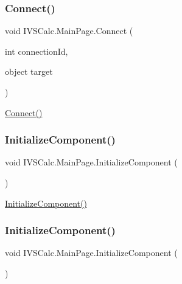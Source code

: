 \subsubsection{\texorpdfstring{Connect()}{Connect()}\hspace{0.1cm}{\footnotesize\ttfamily [5/5]}}
{\footnotesize\ttfamily void I\+V\+S\+Calc.\+Main\+Page.\+Connect (\begin{DoxyParamCaption}\item[{int}]{connection\+Id,  }\item[{object}]{target }\end{DoxyParamCaption})}



\hyperlink{class_i_v_s_calc_1_1_main_page_a36a7263a9c76a6fdfa392266c3b56122}{Connect()} 

\mbox{\label{class_i_v_s_calc_1_1_main_page_a82228985b36d2c45b809d7b2ba489aef}} 
\subsubsection{\texorpdfstring{Initialize\+Component()}{InitializeComponent()}\hspace{0.1cm}{\footnotesize\ttfamily [1/5]}}
{\footnotesize\ttfamily void I\+V\+S\+Calc.\+Main\+Page.\+Initialize\+Component (\begin{DoxyParamCaption}{ }\end{DoxyParamCaption})}



\hyperlink{class_i_v_s_calc_1_1_main_page_a82228985b36d2c45b809d7b2ba489aef}{Initialize\+Component()} 

\mbox{\label{class_i_v_s_calc_1_1_main_page_a82228985b36d2c45b809d7b2ba489aef}} 
\subsubsection{\texorpdfstring{Initialize\+Component()}{InitializeComponent()}\hspace{0.1cm}{\footnotesize\ttfamily [2/5]}}
{\footnotesize\ttfamily void I\+V\+S\+Calc.\+Main\+Page.\+Initialize\+Component (\begin{DoxyParamCaption}{ }\end{DoxyParamCaption})}



